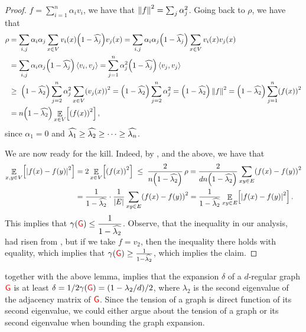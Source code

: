 \begin{proof}
    $f=\sum_{i=1}^n \alpha_i v_i$, we have that $\left\| {f} \right\|^2 = \sum_j
    \alpha_j^2$.  Going back to $\rho$, we have that
    \begin{align}
        \nonumber \rho &= \sum_{i,j} \alpha_i \alpha_j \sum_{x \in V} v_i(x)
        \pth{1- \TEV{j}} v_j(x)
        =%
        \sum_{i,j} \alpha_i \alpha_j \pth{1- \TEV{j}}
        \sum_{x \in V} v_i(x) v_j(x)\\
        &= \sum_{i,j} \alpha_i \alpha_j \pth{1- \TEV{j}}
        \DotProd{v_i}{v_j} = \sum_{j=1}^n \alpha_j^2 \pth{1- \TEV{j}}
        \DotProd{v_j}{v_j}%
        \nonumber \\%
        \eqlab{inequality:tension} &\geq \; \pth{1-
           \TEV{2}} \sum_{j=2}^n \alpha_j^2 \sum_{x \in V}
        \pth{v_j(x)}^2 =
        \pth{1-
           \TEV{2}} \sum_{j=2}^n \alpha_j^2  =         \pth{1-
           \TEV{2}} \norm{f}^2= \pth{1-
           \TEV{2}} \sum_{j=1}^n \pth{f(x) }^2\\
        &= n\pth{1- \TEV{2}} \ExExt{x \in
           V}{\pth[]{f(x)}^2}, \nonumber
    \end{align}
    since $\alpha_1 = 0$ and $\widehat{\lambda_{1}} \geq
    \widehat{\lambda_{2}} \geq \cdots \geq \widehat{\lambda_{n}}$.

    We are now ready for the kill. Indeed, by , and
    the above, we have that
    \begin{align*}
        \ExExt{x,y \in V}{\cardin{f(x)- f(y)}^2} &=2 \ExExt{x \in
           V}{\pth[]{f(x)}^2} \; \leq \; \frac{2}{n\pth[]{1-
              \TEV{2}}} \, \rho = \frac{2}{dn\pth[]{1-
              \TEV{2}}}  \sum_{xy \in E}\pth{ f(x) -f(y) }^2\\
        &= \frac{1}{1- \TEV{2}} \cdot \frac{1}{\cardin{E}}
        \sum_{xy \in E}\pth{ f(x) -f(y) }^2 = \frac{1}{1-
           \TEV{2}} \ExExt{ xy \in E}{\cardin{f(x)-
              f(y)}^2}.
    \end{align*}
    This implies that $\ds \DialX{\Graph} \leq \frac{1}{1-
       \TEV{2}}$. Observe, that the inequality in our analysis, had
    risen from , but if we take $f= v_2$,
    then the inequality there holds with equality, which implies that
    $\DialX{\Graph} \geq \frac{1}{1- \TEV{2}}$, which implies the
    claim.
\end{proof}

\bigskip {} together with the above lemma,
implies that the expansion $\delta$ of a $d$-regular graph ${\textcolor{red}{\mathsf{G}}}$ is
at least $\delta = 1/2\DialX{\Graph} = \pth{1-\lambda_2/d}/2$, where
$\lambda_2$ is the second eigenvalue of the adjacency matrix of
${\textcolor{red}{\mathsf{G}}}$. Since the tension of a graph is direct function of its
second eigenvalue, we could either argue about the tension of a graph
or its second eigenvalue when bounding the graph expansion.







% 
%

\ChapterEnd{}

 
